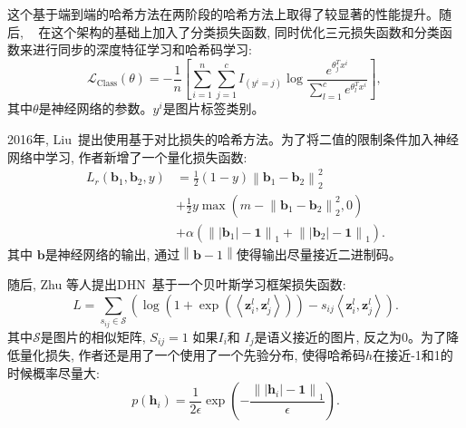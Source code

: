 这个基于端到端的哈希方法在两阶段的哈希方法上取得了较显著的性能提升。随后, ~\cite{yao2016deep} 在这个架构的基础上加入了分类损失函数, 同时优化三元损失函数和分类函数来进行同步的深度特征学习和哈希码学习:
\begin{equation}
    \mathcal{L}_{\text {Class}}(\theta)=-\frac{1}{n}\left[\sum_{i=1}^n \sum_{j=1}^c I_{\left(y^i=j\right)} \log \frac{e^{\theta_j^T x^i}}{\sum_{l=1}^c e^{\theta_l^T x^i}}\right] \text {, }
\end{equation}
其中$\theta$是神经网络的参数。$y^i$是图片标签类别。\par
2016年, Liu~\cite{liu2016deep}提出使用基于对比损失的哈希方法。为了将二值的限制条件加入神经网络中学习, 作者新增了一个量化损失函数:
\begin{equation}
    \begin{aligned}
        L_r\left(\mathbf{b}_1, \mathbf{b}_2, y\right) & =\frac{1}{2}(1-y)\left\|\mathbf{b}_1-\mathbf{b}_2\right\|_2^2 \\
        & +\frac{1}{2} y \max \left(m-\left\|\mathbf{b}_1-\mathbf{b}_2\right\|_2^2, 0\right) \\
        & +\alpha\left(\left\|\left|\mathbf{b}_1\right|-\mathbf{1}\right\|_1+\left\|\left|\mathbf{b}_2\right|-\mathbf{1}\right\|_1\right).
        \end{aligned}
\end{equation}
其中 $\mathbf{b}$是神经网络的输出, 通过$\left \| \mathbf{b} - 1 \right \|$使得输出尽量接近二进制码。\par


随后, Zhu 等人提出DHN~\cite{zhu2016deep}基于一个贝叶斯学习框架损失函数:
\begin{equation}
    L=\sum_{s_{i j} \in \mathcal{S}}\left(\log \left(1+\exp \left(\left\langle\boldsymbol{z}_i^l, \boldsymbol{z}_j^l\right\rangle\right)\right)-s_{i j}\left\langle\boldsymbol{z}_i^l, \boldsymbol{z}_j^l\right\rangle\right).
\end{equation}
其中$\mathcal{S}$是图片的相似矩阵, $S_{ij} = 1$ 如果$I_i$和 $I_j$是语义接近的图片, 反之为0。为了降低量化损失, 作者还是用了一个使用了一个先验分布, 使得哈希码$h$在接近-1和1的时候概率尽量大:
\begin{equation}
    p\left(\boldsymbol{h}_i\right)=\frac{1}{2 \epsilon} \exp \left(-\frac{\left\|\left|\boldsymbol{h}_i\right|-\mathbf{1}\right\|_1}{\epsilon}\right).
\end{equation}

